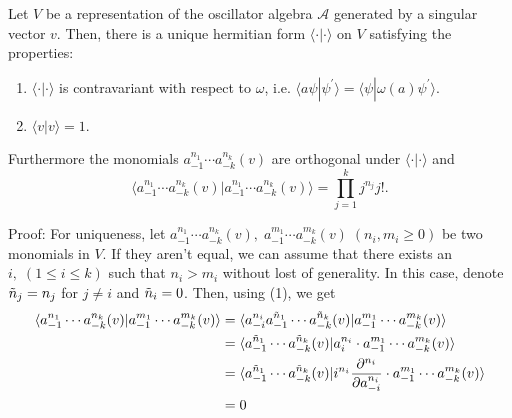 \begin{dang}
    \begin{theorem}\cite{kac2013bombay}\label{Theorem: hermitian form on the representation of the oscillator algebra V}
        Let $V$ be a representation of the oscillator algebra $\mathcal{
        A}$ generated by a singular vector $v$. Then, there is a unique hermitian form $\langle\cdot|\cdot\rangle$ on $V$ satisfying the properties:
        \begin{enumerate}
            \item[(1)] $\langle\cdot|\cdot\rangle$ is contravariant with respect to $\omega$, i.e. $\langle a\psi|\psi^\prime\rangle = \langle\psi|\omega(a)\psi^\prime\rangle.$
            \item[(2)] $\langle v|v\rangle =1$.
        \end{enumerate}
        Furthermore the monomials $a_{-1}^{n_1}\cdots a_{-k}^{n_k}(v)$ are orthogonal under $\langle\cdot|\cdot\rangle$ and
        \begin{equation}\label{Equation: norm of a monomial}
            \langle a_{-1}^{n_1}\cdots a_{-k}^{n_k}(v)|a_{-1}^{n_1}\cdots a_{-k}^{n_k}(v)\rangle =\prod_{j=1}^kj^{n_j}j!.
        \end{equation}
    \end{theorem}
\end{dang}
Proof: For uniqueness, let $a_{-1}^{n_1}\cdots a_{-k}^{n_k}(v),\;a_{-1}^{m_1}\cdots a_{-k}^{m_k}(v)\;(n_i,m_i\geq0)$ be two monomials in $V$. If they aren't equal, 
we can assume that there exists an $i,\;(1\leq i\leq k)$ such that $n_i>m_i$ without lost of generality. In this case, denote $\Tilde{n}_j = n_j$ for $j\neq i$ and $\Tilde{n}_i =0$. Then, using (1), we get
\begin{equation}
    \begin{split}
        \langle a_{-1}^{n_1}\cdots a_{-k}^{n_k}(v)|a_{-1}^{m_1}\cdots a_{-k}^{m_k}(v)\rangle &= \langle a_{-i}^{n_i} a_{-1}^{\Tilde{n}_1}\cdots a_{-k}^{\Tilde{n}_k}(v)|a_{-1}^{m_1}\cdots a_{-k}^{m_k}(v)\rangle\\
         &= \langle  a_{-1}^{\Tilde{n}_1}\cdots a_{-k}^{\Tilde{n}_k}(v)|a_i^{n_i}\cdot a_{-1}^{m_1}\cdots a_{-k}^{m_k}(v)\rangle\\
          &= \langle  a_{-1}^{\Tilde{n}_1}\cdots a_{-k}^{\Tilde{n}_k}(v)|i^{n_i}\frac{\partial^{n_i}}{\partial a_{-i}^{n_i}}\cdot a_{-1}^{m_1}\cdots a_{-k}^{m_k}(v)\rangle\\
          &=0
    \end{split}
\end{equation}

